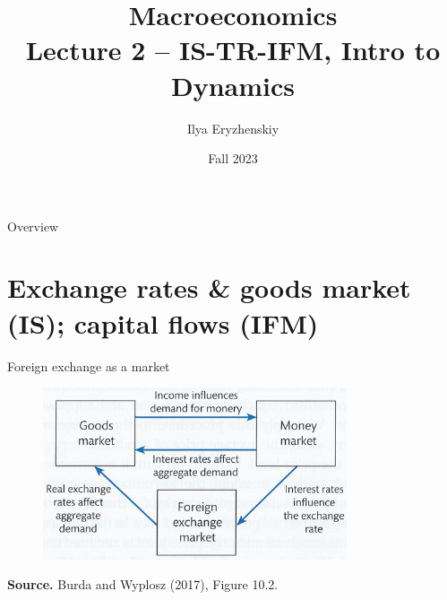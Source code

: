 \documentclass{beamer}
\title[PSME]{Macroeconomics\\ Lecture 2 -- IS-TR-IFM, Intro to Dynamics}
\author[I. Eryzhenskiy]{Ilya Eryzhenskiy}
\institute[BdF]{PSME Panth\'{e}on-Sorbonne Master in Economics}
\date[PSME macro]{Fall 2023}
\begin{document}
\begin{frame}
  \maketitle
\end{frame}

\begin{frame}{Overview}
  \tableofcontents
\end{frame}

\section{Exchange rates \& goods market (IS); capital flows (IFM)}

\begin{frame}
\tableofcontents[currentsection]
\end{frame}

\begin{frame}{Foreign exchange as a market}
  \begin{figure}
	\centering
	\includegraphics[width=0.8\textwidth]{FIGURES/6_GE.png}
  \end{figure}
\begin{minipage}{1.0\columnwidth}
\tiny	
\textbf{Source.} Burda and Wyplosz (2017), Figure 10.2.\\
\end{minipage}
\end{frame}
\end{document}
